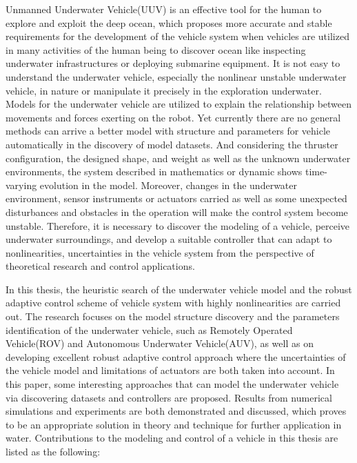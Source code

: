 \begin{englishabstract}
Unmanned Underwater Vehicle(UUV) is an effective tool for the human to explore and exploit the deep ocean, which proposes more accurate and stable requirements for the development of the vehicle system when vehicles are utilized in many activities of the human being to discover ocean like inspecting underwater infrastructures or deploying submarine equipment. It is not easy to understand the underwater vehicle, especially the nonlinear unstable underwater vehicle, in nature or manipulate it precisely in the exploration underwater. Models for the underwater vehicle are utilized to explain the relationship between movements and forces exerting on the robot. Yet currently there are no general methods can arrive a better model with structure and parameters for vehicle automatically in the discovery of model datasets. And considering the thruster configuration, the designed shape, and weight as well as the unknown underwater environments, the system described in mathematics or dynamic shows time-varying evolution in the model. Moreover, changes in the underwater environment, sensor instruments or actuators carried as well as some unexpected disturbances and obstacles in the operation will make the control system become unstable. Therefore, it is necessary to discover the modeling of a vehicle, perceive underwater surroundings, and develop a suitable controller that can adapt to nonlinearities, uncertainties in the vehicle system from the perspective of theoretical research and control applications.

In this thesis, the heuristic search of the underwater vehicle model and the robust adaptive control scheme of vehicle system with highly nonlinearities are carried out.  The research focuses on the model structure discovery and the parameters identification of the underwater vehicle, such as Remotely Operated Vehicle(ROV) and Autonomous Underwater Vehicle(AUV), as well as on developing excellent robust adaptive control approach where the uncertainties of the vehicle model and limitations of actuators are both taken into account. In this paper, some interesting approaches that can model the underwater vehicle via discovering datasets and controllers are proposed. Results from numerical simulations and experiments are both demonstrated and discussed, which proves to be an appropriate solution in theory and technique for further application in water. Contributions to the modeling and control of a vehicle in this thesis are listed as the following:



\end{englishabstract}
